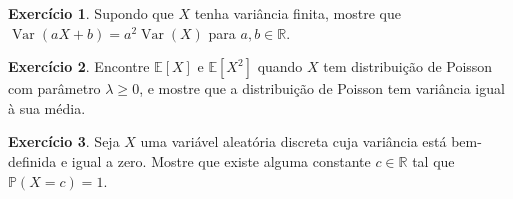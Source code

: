 \documentclass[12pt,portuguese]{article}
\theoremstyle{definition}
\newtheorem{exercise}{Exercício}
\begin{document}
\begin{exercise}\label{exercise:var-afim}
Supondo que \(X\) tenha variância finita, mostre que
\(\operatorname{Var}(aX + b) = a^2 \operatorname{Var}(X)\) para
\(a, b \in \mathbb{R}\).
\end{exercise}

\begin{exercise}\label{exercise:poisson-variancia}
Encontre \(\mathbb{E}[X]\) e \(\mathbb{E}[X^2]\) quando \(X\) tem distribuição
de Poisson com parâmetro \(\lambda\geqslant 0\), e mostre que a distribuição de Poisson
tem variância igual à sua média.
\end{exercise}


\begin{exercise}\label{exercise:variancia-zero}
Seja $X$ uma variável aleatória discreta cuja variância está bem-definida e igual a zero.
Mostre que existe alguma constante $c\in\mathbb{R}$ tal que 
$\mathbb{P}(X=c)=1$.
\end{exercise}




\end{document}
